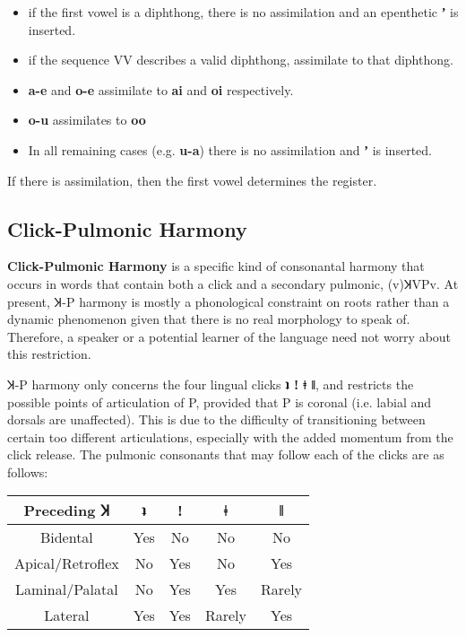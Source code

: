 \documentclass[11pt,a5paper]{book}
\newcommand{\qcn}[1]{\textcolor{AccentText}{\large\textbf{#1}}}
\begin{document}
\begin{itemize}
\item if the first vowel is a diphthong, there is no assimilation and an epenthetic \qcn{ʼ} is inserted.
\item if the sequence VV describes a valid diphthong, assimilate to that diphthong.
\item \qcn{a-e} and \qcn{o-e} assimilate to \qcn{ai} and \qcn{oi} respectively.
\item \qcn{o-u} assimilates to \qcn{oo}
\item In all remaining cases (e.g. \qcn{u-a}) there is no assimilation and \qcn{ʼ} is inserted.
\end{itemize}

If there is assimilation, then the first vowel determines the register.

\subsection{Click-Pulmonic Harmony}

\textbf{Click-Pulmonic Harmony} is a specific kind of consonantal harmony that occurs in words that contain both a click and a secondary pulmonic, (v)ꞰVPv. At present, Ʞ-P harmony is mostly a phonological constraint on roots rather than a dynamic phenomenon given that there is no real morphology to speak of. Therefore, a speaker or a potential learner of the language need not worry about this restriction.

Ʞ-P harmony only concerns the four lingual clicks \qcn{ʇ ǃ ǂ ǁ}, and restricts the possible points of articulation of P, provided that P is coronal (i.e. labial and dorsals are unaffected). This is due to the difficulty of transitioning between certain too different articulations, especially with the added momentum from the click release. The pulmonic consonants that may follow each of the clicks are as follows:

\begin{center}
\begin{tabular}{|c|c|c|c|c|}
\hline
Preceding Ʞ & \qcn{ʇ} & \qcn{ǃ} & \qcn{ǂ} & \qcn{ǁ} \\ \hline \hline
Bidental & Yes & No & No & No \\\hline
Apical/Retroflex & No & Yes & No & Yes \\\hline
Laminal/Palatal & No & Yes & Yes & Rarely \\\hline
Lateral & Yes & Yes & Rarely & Yes \\ \hline
\end{tabular}
\end{center}
\end{document}
